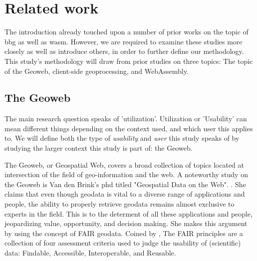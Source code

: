\chapter{Related work}

The introduction already touched upon a number of prior works on the topic of \ac{bbg} as well as \ac{wasm}.
However, we are required to examine these studies more closely as well as introduce others, in order to further define our methodology. This study's methodology will draw from prior studies on three topics: The topic of the Geoweb, client-side geoprocessing, and WebAssembly.




\section{The Geoweb}

\label{sec:geoweb}

The main research question speaks of 'utilization'. Utilization or 'Usability' can mean different things depending on the context used, and which user this applies to. We will define both the type of \emph{usability} and \emph{user} this study speaks of by studying the larger context this study is part of: the Geoweb.

The Geoweb, or Geospatial Web, covers a broad collection of topics located at intersection of the field of geo-information and the web. A noteworthy study on the Geoweb is Van den Brink's phd titled "Geospatial Data on the Web". \cite{brink_geospatial_2018}. She claims that even though geodata is vital to a diverse range of applications and people, the ability to properly retrieve geodata remains almost exclusive to experts in the field. This is to the determent of all these applications and people, jeopardizing value, opportunity, and decision making. She makes this argument by using the concept of FAIR geodata. Coined by \cite{mark_d_wilkinson_fair_2016}, The FAIR principles are a collection of four assessment criteria used to judge the usability of (scientific) data: Findable, Accessible, Interoperable, and Reusable. 

